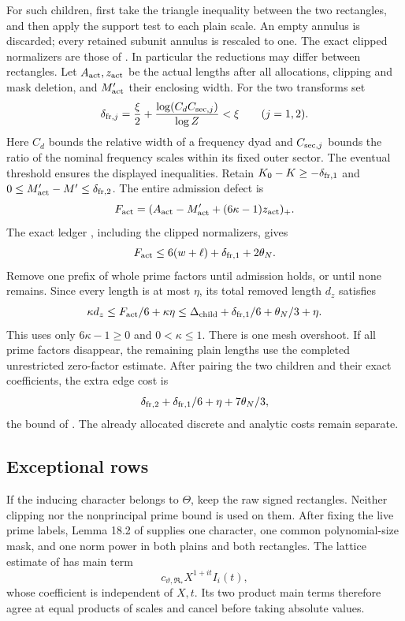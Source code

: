 For such children, first take the triangle inequality between
the two rectangles, and then apply the support test to each plain
scale. An empty annulus is discarded; every retained subunit
annulus is rescaled to one. The exact clipped normalizers are those
of \cite[(18.34)--(18.37)]{OAI26}. In particular the reductions
may differ between rectangles. Let $A_{\rm act},z_{\rm act}$ be
the actual lengths after all allocations, clipping and mask deletion,
and $M'_{\rm act}$ their enclosing width. For the two transforms set
\[
 \delta_{{\rm fr},j}=\frac{\xi}{2}+
       \frac{\log(C_dC_{{\rm sec},j})}{\log Z}<\xi
       \qquad(j=1,2).
\]
Here $C_d$ bounds the relative width of a frequency dyad and
$C_{{\rm sec},j}$ bounds the ratio of the nominal frequency scales
within its fixed outer sector. The eventual threshold ensures the
displayed inequalities. Retain
$K_0-K\ge-\delta_{{\rm fr},1}$ and
$0\le M'_{\rm act}-M'\le\delta_{{\rm fr},2}$.
The entire admission defect is
\[
 F_{\rm act}=(A_{\rm act}-M'_{\rm act}+
                    (6\kappa-1)z_{\rm act})_+ .
\]
The exact ledger \cite[(18.38)]{OAI26}, including the clipped
normalizers, gives
\[
 F_{\rm act}\le6(w+\ell)+\delta_{{\rm fr},1}+2\theta_N .
\]
Remove one prefix of whole prime factors until admission holds,
or until none remains. Since every length is at most $\eta$, its
total removed length $d_z$ satisfies
\[
 \kappa d_z\le F_{\rm act}/6+\kappa\eta
       \le\Delta_{\rm child}
          +\delta_{{\rm fr},1}/6+\theta_N/3+\eta .
\]
This uses only $6\kappa-1\ge0$ and $0<\kappa\le1$.
There is one mesh overshoot. If all prime factors disappear, the
remaining plain lengths use the completed unrestricted zero-factor
estimate. After pairing the two children and their exact coefficients,
the extra edge cost is
\begin{equation}\label{adp:edge-cost}
 \delta_{{\rm fr},2}+\delta_{{\rm fr},1}/6+
             \eta+7\theta_N/3 ,
\end{equation}
the bound of \cite[(18.40)]{OAI26}. The already allocated discrete
and analytic costs remain separate.

\subsection{Exceptional rows}

If the inducing character belongs to $\Theta$, keep the raw signed
rectangles. Neither clipping nor the nonprincipal prime bound is
used on them. After fixing the live prime labels, Lemma 18.2 of
\cite{OAI26} supplies one character, one common polynomial-size
mask, and one norm power in both plains and both rectangles.
The lattice estimate of \cite[Lemma 18.3]{OAI26} has main term
\[
 c_{\vartheta,\mathfrak R_*}X^{1+it}I_i(t),
\]
whose coefficient is independent of $X,t$.
Its two product main terms therefore agree at equal products of
scales and cancel before taking absolute values.

